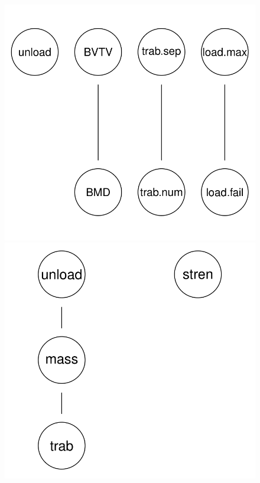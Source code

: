\documentclass{article}
\begin{document}
\begin{figure}[h] %
    \begin{minipage}{0.45\textwidth}
        \centering
        \includegraphics[width=\linewidth]{natural-1.png}
    \end{minipage}
    \hfill
    \begin{minipage}{0.45\textwidth}
        \centering
        \includegraphics[width=\linewidth]{synthetic-1.png}
    \end{minipage}
\end{figure}
\end{document}
